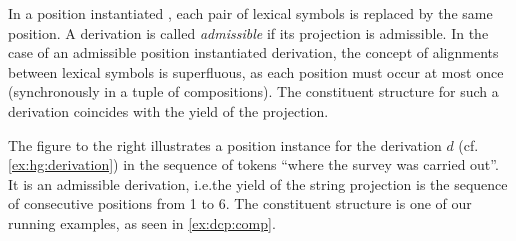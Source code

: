 \documentclass[../../document.tex]{subfiles}
\begin{document}
    In a position instantiated , each pair of lexical symbols is replaced by the same position.
    A derivation is called \emph{admissible} if its  projection is admissible.
    In the case of an admissible position instantiated derivation, the concept of alignments between lexical symbols is superfluous, as each position must occur at most once (synchronously in a tuple of compositions).
    The constituent structure for such a derivation coincides with the yield of the  projection.

    \vspace{\baselineskip}

    \noindent
    \begin{minipage}{.4\linewidth}
        \begin{example}
            The figure to the right illustrates a position instance for the derivation \(d\) (cf.\@ \cref{ex:hg:derivation}) in the sequence of tokens ``where the survey was carried out''.
            It is an admissible derivation, i.e.\@ the yield of the string projection is the sequence of consecutive positions from 1 to 6.
            The constituent structure is one of our running examples, as seen in \cref{ex:dcp:comp}.
        \end{example}
    \end{minipage}
        \hfill
\end{document}
